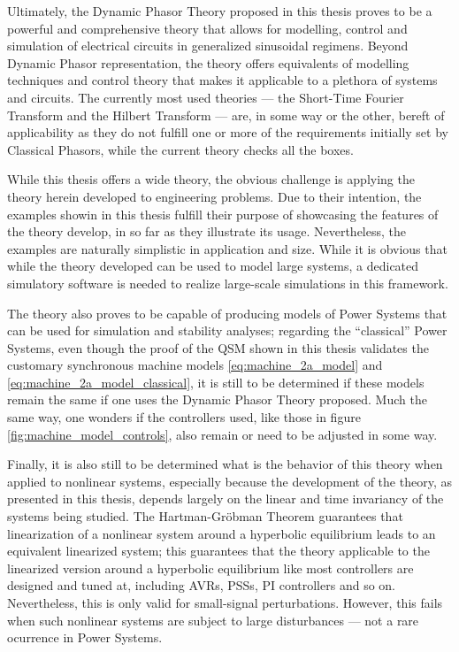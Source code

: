 	Ultimately, the Dynamic Phasor Theory proposed in this thesis proves to be a powerful and comprehensive theory that allows for modelling, control and simulation of electrical circuits in generalized sinusoidal regimens. Beyond Dynamic Phasor representation, the theory offers equivalents of modelling techniques and control theory that makes it applicable to a plethora of systems and circuits. The currently most used theories — the Short-Time Fourier Transform and the Hilbert Transform — are, in some way or the other, bereft of applicability as they do not fulfill one or more of the requirements initially set by Classical Phasors, while the current theory checks all the boxes.

	While this thesis offers a wide theory, the obvious challenge is applying the theory herein developed to engineering problems. Due to their intention, the examples showin in this thesis fulfill their purpose of showcasing the features of the theory develop, in so far as they illustrate its usage. Nevertheless, the examples are naturally simplistic in application and size. While it is obvious that while the theory developed can be used to model large systems, a dedicated simulatory software is needed to realize large-scale simulations in this framework.

	The theory also proves to be capable of producing models of Power Systems that can be used for simulation and stability analyses; regarding the ``classical'' Power Systems, even though the proof of the QSM shown in this thesis validates the customary synchronous machine models \eqref{eq:machine_2a_model} and \eqref{eq:machine_2a_model_classical}, it is still to be determined if these models remain the same if one uses the Dynamic Phasor Theory proposed. Much the same way, one wonders if the controllers used, like those in figure \ref{fig:machine_model_controls}, also remain or need to be adjusted in some way.

	Finally, it is also still to be determined what is the behavior of this theory when applied to nonlinear systems, especially because the development of the theory, as presented in this thesis, depends largely on the linear and time invariancy of the systems being studied. The Hartman-Gröbman Theorem guarantees that linearization of a nonlinear system around a hyperbolic equilibrium leads to an equivalent linearized system; this guarantees that the theory applicable to the linearized version around a hyperbolic equilibrium like most controllers are designed and tuned at, including AVRs, PSSs, PI controllers and so on. Nevertheless, this is only valid for small-signal perturbations. However, this fails when such nonlinear systems are subject to large disturbances — not a rare ocurrence in Power Systems.
